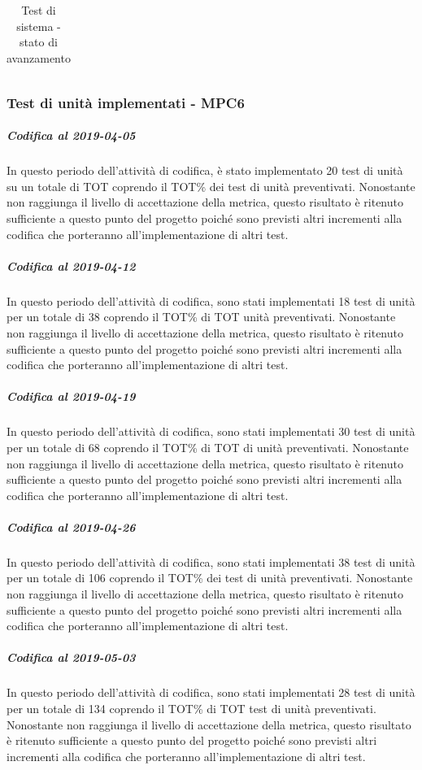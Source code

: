 \begin{longtable}{|>{\centering\arraybackslash}m{1.6cm}|>{\centering\arraybackslash}m{6.41cm}|>{\centering\arraybackslash}m{3.1cm}|}
		\caption{Test di sistema - stato di avanzamento}
\end{longtable}



\subsubsection{Test di unità implementati - MPC6}
\subparagraph{Codifica al 2019-04-05}
In questo periodo dell'attività di codifica, è stato implementato 20 test di unità su un totale di TOT coprendo il TOT\% dei test di unità preventivati.
Nonostante non raggiunga il livello di accettazione della
metrica, questo risultato è ritenuto sufficiente a questo punto del progetto poiché sono previsti altri incrementi alla codifica che porteranno all'implementazione di altri test.

\subparagraph{Codifica al 2019-04-12}
In questo periodo dell'attività di codifica, sono stati implementati 18 test di unità per un totale di 38 coprendo il TOT\% di TOT unità preventivati.
Nonostante non raggiunga il livello di accettazione della
metrica, questo risultato è ritenuto sufficiente a questo punto del progetto poiché sono previsti altri incrementi alla codifica che porteranno all'implementazione di altri test.

\subparagraph{Codifica al 2019-04-19}
In questo periodo dell'attività di codifica, sono stati implementati 30 test di unità per un totale di 68 coprendo il TOT\% di TOT di unità preventivati.
Nonostante non raggiunga il livello di accettazione della
metrica, questo risultato è ritenuto sufficiente a questo punto del progetto poiché sono previsti altri incrementi alla codifica che porteranno all'implementazione di altri test.

\subparagraph{Codifica al 2019-04-26}
In questo periodo dell'attività di codifica, sono stati implementati 38 test di unità per un totale di 106 coprendo il TOT\% dei test di unità preventivati.
Nonostante non raggiunga il livello di accettazione della
metrica, questo risultato è ritenuto sufficiente a questo punto del progetto poiché sono previsti altri incrementi alla codifica che porteranno all'implementazione di altri test.

\subparagraph{Codifica al 2019-05-03}
In questo periodo dell'attività di codifica, sono stati implementati 28 test di unità per un totale di 134 coprendo il TOT\% di TOT test di unità preventivati.
Nonostante non raggiunga il livello di accettazione della
metrica, questo risultato è ritenuto sufficiente a questo punto del progetto poiché sono previsti altri incrementi alla codifica che porteranno all'implementazione di altri test.

